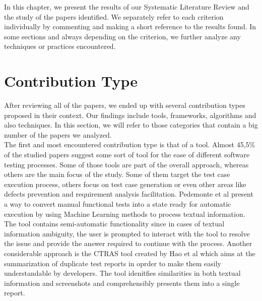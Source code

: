 In this chapter, we present the results of our Systematic Literature Review and the study of the papers identified. We separately refer to 
each criterion individually by commenting and making a short reference to the results found. In some sections and always depending on the criterion, we further analyze any 
techniques or practices encountered. 

\section {Contribution Type}
After reviewing all of the papers, we ended up with several contribution types proposed in their context. Our findings include tools, frameworks, algorithms and also techniques. 
In this section, we will refer to those categories that contain a big number of the papers we analyzed.\\

The first and most encountered contribution type is that of a tool. Almost 45,5\% of the studied papers suggest some sort of tool for the ease of different software testing processes. 
Some of those tools are part of the overall approach, whereas others are the main focus of the study. Some of them target the test case execution process, others focus on test case 
generation or even other areas like defects prevention and requirement analysis facilitation. Pedemonte et al \cite{pedemonte2012towards} present a way to convert manual 
functional tests into a state ready for automatic execution by using Machine Learning methods to process textual information. The tool contains semi-automatic functionality since in cases 
of textual information ambiguity, the user is prompted to interact with the tool to resolve the issue and provide the answer required to continue with the process. Another 
considerable approach is the CTRAS tool created by Hao et al \cite{8811987} which aims at the summarization of duplicate test reports in oprder to make them easily understandable 
by developers. The tool idenitfies similarities in both textual information and screenshots and comprehensibly presents them into a single report. \\

